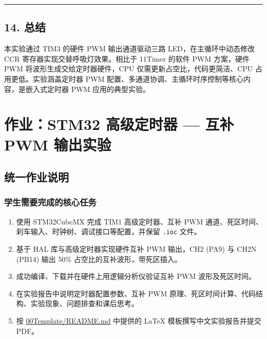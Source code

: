 \documentclass[
  chinese,
  UTF8,
  oneside,
  openany]{ctexbook}
\providecommand{\tightlist}{%
  \setlength{\itemsep}{0pt}\setlength{\parskip}{0pt}}
\begin{document}
\begin{center}\rule{0.5\linewidth}{0.5pt}\end{center}

\section{14. 总结}\label{ux603bux7ed3-4}

本实验通过 TIM3 的硬件 PWM 输出通道驱动三路 LED，在主循环中动态修改 CCR
寄存器实现交替呼吸灯效果。相比于 11Timer 的软件 PWM 方案，硬件 PWM
将波形生成交给定时器硬件，CPU 仅需更新占空比，代码更简洁、CPU
占用更低。实验涵盖定时器 PWM
配置、多通道协调、主循环时序控制等核心内容，是嵌入式定时器 PWM
应用的典型实验。

\chapter{作业：STM32 高级定时器 --- 互补 PWM
输出实验}\label{ux4f5cux4e1astm32-ux9ad8ux7ea7ux5b9aux65f6ux5668-ux4e92ux8865-pwm-ux8f93ux51faux5b9eux9a8c}

\section{统一作业说明}\label{ux7edfux4e00ux4f5cux4e1aux8bf4ux660e-8}

\subsection{学生需要完成的核心任务}\label{ux5b66ux751fux9700ux8981ux5b8cux6210ux7684ux6838ux5fc3ux4efbux52a1-8}

\begin{enumerate}
\def\labelenumi{\arabic{enumi}.}
\tightlist
\item
  使用 STM32CubeMX 完成 TIM1 高级定时器、互补 PWM
  通道、死区时间、刹车输入、时钟树、调试接口等配置，并保留 \texttt{.ioc}
  文件。
\item
  基于 HAL 库与高级定时器实现硬件互补 PWM 输出，CH2 (PA9) 与 CH2N (PB14)
  输出 50\% 占空比的互补波形，带死区插入。
\item
  成功编译、下载并在硬件上用逻辑分析仪验证互补 PWM 波形及死区时间。
\item
  在实验报告中说明定时器配置参数、互补 PWM
  原理、死区时间计算、代码结构、实验现象、问题排查和课后思考。
\item
  按 \href{../00Template/README.md}{00Template/README.md} 中提供的 LaTeX
  模板撰写中文实验报告并提交 PDF。
\end{enumerate}
\end{document}
